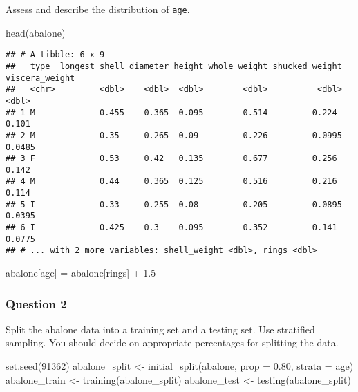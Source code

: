 \documentclass[
]{article}
\newenvironment{Shaded}{\begin{snugshade}}{\end{snugshade}}
\newcommand{\AttributeTok}[1]{\textcolor[rgb]{0.77,0.63,0.00}{#1}}
\newcommand{\DecValTok}[1]{\textcolor[rgb]{0.00,0.00,0.81}{#1}}
\newcommand{\FloatTok}[1]{\textcolor[rgb]{0.00,0.00,0.81}{#1}}
\newcommand{\FunctionTok}[1]{\textcolor[rgb]{0.00,0.00,0.00}{#1}}
\newcommand{\NormalTok}[1]{#1}
\newcommand{\OtherTok}[1]{\textcolor[rgb]{0.56,0.35,0.01}{#1}}
\newcommand{\SpecialCharTok}[1]{\textcolor[rgb]{0.00,0.00,0.00}{#1}}
\newcommand{\StringTok}[1]{\textcolor[rgb]{0.31,0.60,0.02}{#1}}
\begin{document}
Assess and describe the distribution of \texttt{age}.

\begin{Shaded}
\begin{Highlighting}[]
\FunctionTok{head}\NormalTok{(abalone)}
\end{Highlighting}
\end{Shaded}

\begin{verbatim}
## # A tibble: 6 x 9
##   type  longest_shell diameter height whole_weight shucked_weight viscera_weight
##   <chr>         <dbl>    <dbl>  <dbl>        <dbl>          <dbl>          <dbl>
## 1 M             0.455    0.365  0.095        0.514         0.224          0.101 
## 2 M             0.35     0.265  0.09         0.226         0.0995         0.0485
## 3 F             0.53     0.42   0.135        0.677         0.256          0.142 
## 4 M             0.44     0.365  0.125        0.516         0.216          0.114 
## 5 I             0.33     0.255  0.08         0.205         0.0895         0.0395
## 6 I             0.425    0.3    0.095        0.352         0.141          0.0775
## # ... with 2 more variables: shell_weight <dbl>, rings <dbl>
\end{verbatim}

\begin{Shaded}
\begin{Highlighting}[]
\NormalTok{abalone[}\StringTok{\textquotesingle{}age\textquotesingle{}}\NormalTok{] }\OtherTok{=}\NormalTok{ abalone[}\StringTok{\textquotesingle{}rings\textquotesingle{}}\NormalTok{] }\SpecialCharTok{+} \FloatTok{1.5}
\end{Highlighting}
\end{Shaded}

\hypertarget{question-2}{%
\subsubsection{Question 2}\label{question-2}}

Split the abalone data into a training set and a testing set. Use
stratified sampling. You should decide on appropriate percentages for
splitting the data.

\begin{Shaded}
\begin{Highlighting}[]
\FunctionTok{set.seed}\NormalTok{(}\DecValTok{91362}\NormalTok{)}
\NormalTok{abalone\_split }\OtherTok{\textless{}{-}} \FunctionTok{initial\_split}\NormalTok{(abalone, }\AttributeTok{prop =} \FloatTok{0.80}\NormalTok{, }\AttributeTok{strata =} \StringTok{\textquotesingle{}age\textquotesingle{}}\NormalTok{)}
\NormalTok{abalone\_train }\OtherTok{\textless{}{-}} \FunctionTok{training}\NormalTok{(abalone\_split)}
\NormalTok{abalone\_test }\OtherTok{\textless{}{-}} \FunctionTok{testing}\NormalTok{(abalone\_split)}
\end{Highlighting}
\end{Shaded}
\end{document}
